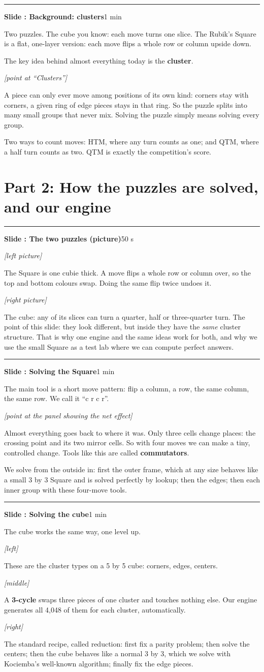 \documentclass[11pt,a4paper]{article}
\newcounter{slide}
\newcommand{\slide}[2]{\par\bigskip\stepcounter{slide}%
  {\color{NavyBlue}\rule{\linewidth}{0.4pt}}\par
  \textbf{\large Slide \arabic{slide}: #1}\hfill{\small\color{gray}#2}\par}
\newcommand{\act}[1]{\par{\small\color{OliveGreen}\textit{[#1]}}\par}
\begin{document}
\slide{Background: clusters}{1 min}
Two puzzles. The cube you know: each move turns one slice. The Rubik's Square is a flat, one-layer version: each move flips a
whole row or column upside down.

The key idea behind almost everything today is the \textbf{cluster}. \act{point at ``Clusters''}
A piece can only ever move among positions of its own kind: corners stay with corners, a given ring of edge pieces stays in
that ring. So the puzzle splits into many small groups that never mix. Solving the puzzle simply means solving every group.

Two ways to count moves: HTM, where any turn counts as one; and QTM, where a half turn counts as two. QTM is exactly the
competition's score.

\section{Part 2: How the puzzles are solved, and our engine}

\slide{The two puzzles (picture)}{50 s}
\act{left picture} The Square is one cubie thick. A move flips a whole row or column over, so the top and bottom colours swap.
Doing the same flip twice undoes it.
\act{right picture} The cube: any of its slices can turn a quarter, half or three-quarter turn.
The point of this slide: they look different, but inside they have the \emph{same} cluster structure. That is why one engine
and the same ideas work for both, and why we use the small Square as a test lab where we can compute perfect answers.

\slide{Solving the Square}{1 min}
The main tool is a short move pattern: flip a column, a row, the same column, the same row. We call it ``c r c r''.
\act{point at the panel showing the net effect}
Almost everything goes back to where it was. Only three cells change places: the crossing point and its two mirror cells.
So with four moves we can make a tiny, controlled change. Tools like this are called \textbf{commutators}.

We solve from the outside in: first the outer frame, which at any size behaves like a small 3 by 3 Square and is solved
perfectly by lookup; then the edges; then each inner group with these four-move tools.

\slide{Solving the cube}{1 min}
The cube works the same way, one level up.
\act{left} These are the cluster types on a 5 by 5 cube: corners, edges, centers.
\act{middle} A \textbf{3-cycle} swaps three pieces of one cluster and touches nothing else. Our engine generates all 4,048 of them
for each cluster, automatically.
\act{right} The standard recipe, called reduction: first fix a parity problem; then solve the centers; then the cube behaves like
a normal 3 by 3, which we solve with Kociemba's well-known algorithm; finally fix the edge pieces.
\end{document}
